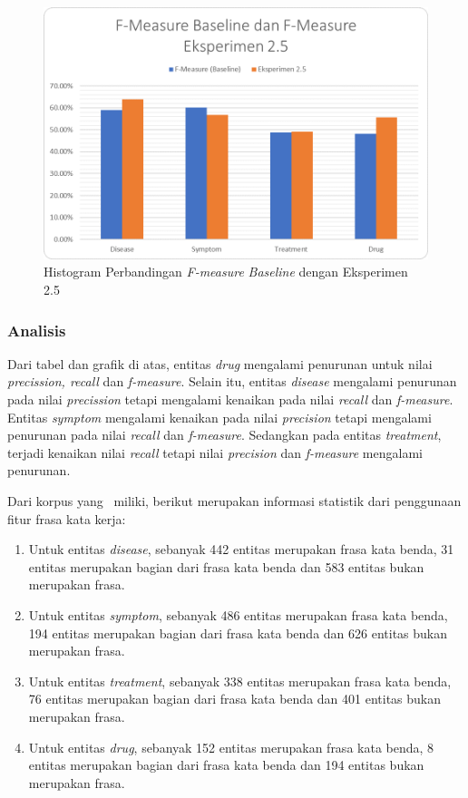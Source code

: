 	\begin{figure}
		\centering
		\includegraphics[width=0.85\linewidth]{images/histogram5}
		\caption{Histogram Perbandingan \textit{F-measure} \textit{Baseline} dengan Eksperimen 2.5}
		\label{fig:owndict5}
	\end{figure}

	\subsubsection{Analisis}
	Dari tabel dan grafik di atas, entitas \textit{drug} mengalami penurunan untuk nilai \textit{precission, recall} dan \textit{f-measure}. Selain itu, entitas \textit{disease} mengalami penurunan pada nilai \textit{precission} tetapi mengalami kenaikan pada nilai \textit{recall} dan \textit{f-measure}. Entitas \textit{symptom} mengalami kenaikan pada nilai \textit{precision} tetapi mengalami penurunan pada nilai \textit{recall} dan \textit{f-measure}. Sedangkan pada entitas \textit{treatment}, terjadi kenaikan nilai \textit{recall} tetapi nilai \textit{precision} dan \textit{f-measure} mengalami penurunan. 
	
	Dari korpus yang \saya~miliki, berikut merupakan informasi statistik dari penggunaan fitur frasa kata kerja:
	\begin{enumerate}
		\item Untuk entitas \textit{disease}, sebanyak 442 entitas merupakan frasa kata benda, 31 entitas merupakan bagian dari frasa kata benda dan 583 entitas bukan merupakan frasa.
		\item Untuk entitas \textit{symptom}, sebanyak 486 entitas merupakan frasa kata benda, 194 entitas merupakan bagian dari frasa kata benda dan 626 entitas bukan merupakan frasa.
		\item Untuk entitas \textit{treatment}, sebanyak 338 entitas merupakan frasa kata benda, 76 entitas merupakan bagian dari frasa kata benda dan 401 entitas bukan merupakan frasa.
		\item Untuk entitas \textit{drug}, sebanyak 152 entitas merupakan frasa kata benda, 8 entitas merupakan bagian dari frasa kata benda dan 194 entitas bukan merupakan frasa.
	\end{enumerate}

